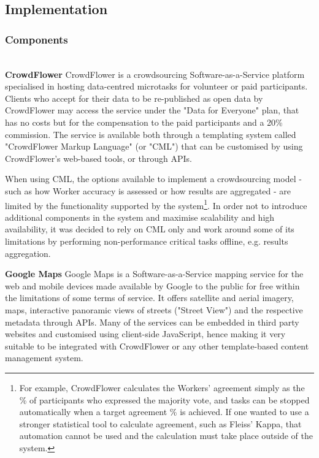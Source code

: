 \subsection{Implementation}

\subsubsection{Components} \leavevmode \\ %

\textbf{CrowdFlower} CrowdFlower is a crowdsourcing Software-as-a-Service platform specialised in hosting data-centred microtasks for volunteer or paid participants. Clients who accept for their data to be re-published as open data by CrowdFlower may access the service under the "Data for Everyone" plan, that has no costs but for the compensation to the paid participants and a 20\% commission. The service is available both through a templating system called "CrowdFlower Markup Language" (or "CML") that can be customised by using CrowdFlower's web-based tools, or through APIs. 

When using CML, the options available to implement a crowdsourcing model - such as how Worker accuracy is assessed or how results are aggregated - are limited by the functionality supported by the system\footnote{For example, CrowdFlower calculates the Workers' agreement simply as the \% of participants who expressed the majority vote, and tasks can be stopped automatically when a target agreement \% is achieved. If one wanted to use a stronger statistical tool to calculate agreement, such as Fleiss' Kappa, that automation cannot be used and the calculation must take place outside of the system.}. In order not to introduce additional components in the system and maximise scalability and high availability, it was decided to rely on CML only and work around some of its limitations by performing non-performance critical tasks offline, e.g. results aggregation. 

\textbf{Google Maps} Google Maps is a Software-as-a-Service mapping service for the web and mobile devices made available by Google to the public for free within the limitations of some terms of service. It offers satellite and aerial imagery, maps, interactive panoramic views of streets ("Street View") and the respective metadata through APIs. Many of the services can be embedded in third party websites and customised using client-side JavaScript, hence making it very suitable to be integrated with CrowdFlower or any other template-based content management system. 

